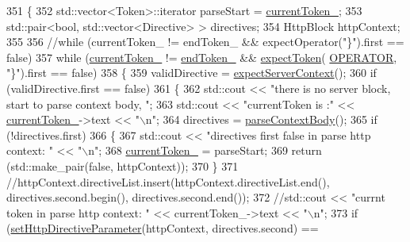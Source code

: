 \begin{DoxyCode}
351     \{
352         std::vector<Token>::iterator parseStart = \hyperlink{classft_1_1_parser_a942c5b794d108f144c5b5028aaa34cb6}{currentToken\_};
353         std::pair<bool, std::vector<Directive> > directives;
354         HttpBlock   httpContext;
355 
356         \textcolor{comment}{//while (currentToken\_ != endToken\_ && expectOperator("\}").first == false)}
357         \textcolor{keywordflow}{while} (\hyperlink{classft_1_1_parser_a942c5b794d108f144c5b5028aaa34cb6}{currentToken\_} != \hyperlink{classft_1_1_parser_a538ba3ab8ee1d0cef5cc3c999f3ab44c}{endToken\_} && \hyperlink{classft_1_1_parser_a1615a752d3642bb53598e2c8db810db0}{expectToken}(
      \hyperlink{namespaceft_aa520fbf142ba1e7e659590c07da31921a6411d9d6073252e4d316493506bbb979}{OPERATOR}, \textcolor{stringliteral}{"\}"}).first == \textcolor{keyword}{false})
358         \{
359             validDirective = \hyperlink{classft_1_1_parser_a72f108d920a35284bf8f740bb8240acd}{expectServerContext}();
360             \textcolor{keywordflow}{if} (validDirective.first == \textcolor{keyword}{false})
361             \{
362                 std::cout << \textcolor{stringliteral}{"there is no server block, start to parse context body, "};
363                 std::cout << \textcolor{stringliteral}{"currentToken is :"} << \hyperlink{classft_1_1_parser_a942c5b794d108f144c5b5028aaa34cb6}{currentToken\_}->text << \textcolor{stringliteral}{"\(\backslash\)n"};
364                 directives = \hyperlink{classft_1_1_parser_aa8d68b83134b46e4b9115d9acd0cbf57}{parseContextBody}();
365                 \textcolor{keywordflow}{if} (!directives.first)
366                 \{
367                     std::cout << \textcolor{stringliteral}{"directives first false in parse http context: "} << \textcolor{stringliteral}{"\(\backslash\)n"};
368                     \hyperlink{classft_1_1_parser_a942c5b794d108f144c5b5028aaa34cb6}{currentToken\_} = parseStart;
369                     \textcolor{keywordflow}{return} (std::make\_pair(\textcolor{keyword}{false}, httpContext));
370                 \}
371                 \textcolor{comment}{//httpContext.directiveList.insert(httpContext.directiveList.end(),
       directives.second.begin(), directives.second.end());}
372                 \textcolor{comment}{//std::cout << "currnt token in parse http context: " << currentToken\_->text << "\(\backslash\)n";}
373                 \textcolor{keywordflow}{if} (\hyperlink{classft_1_1_parser_a5d287909e4c513e20b017ba0699b0cbf}{setHttpDirectiveParameter}(httpContext, directives.second) == \textcolor{keyword}{
}
\end{DoxyCode}
